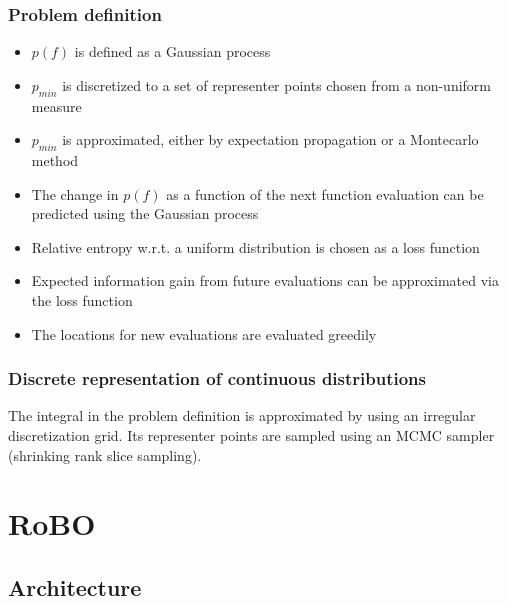 \documentclass[10pt,handout]{beamer}
\begin{document}
 
\begin{frame}
\frametitle{Problem definition}

\begin{itemize}
	\item $p(f)$ is defined as a Gaussian process
	\item $p_{min}$ is discretized to a set of representer points chosen from
	a non-uniform measure
	\item $p_{min}$ is approximated, either by expectation propagation
	or a Montecarlo method
	\item The change in $p(f)$ as a function of the next function evaluation
	can be predicted using the Gaussian process
	\item Relative entropy w.r.t. a uniform distribution is chosen as a loss
	function
	\item Expected information gain from future evaluations can be 
	approximated via the loss function
	\item The locations for new evaluations are evaluated greedily
\end{itemize}

\end{frame}



\begin{frame}
\frametitle{Discrete representation of continuous distributions}

The integral in the problem definition is approximated by using an irregular
discretization grid. Its representer points are sampled using an MCMC sampler
(shrinking rank slice sampling).

\end{frame}


\section{RoBO}

\subsection{Architecture}
\end{document}
